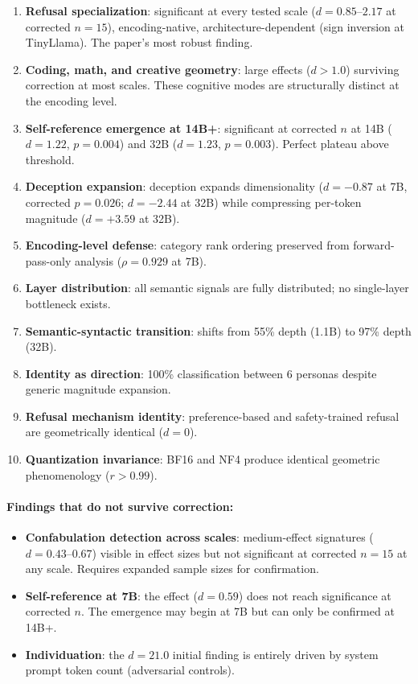 \documentclass[11pt,a4paper]{article}
\begin{document}
\begin{enumerate}[leftmargin=*]
    \item \textbf{Refusal specialization}: significant at every tested scale ($d = 0.85$--$2.17$ at corrected $n = 15$), encoding-native, architecture-dependent (sign inversion at TinyLlama). The paper's most robust finding.
    \item \textbf{Coding, math, and creative geometry}: large effects ($d > 1.0$) surviving correction at most scales. These cognitive modes are structurally distinct at the encoding level.
    \item \textbf{Self-reference emergence at 14B+}: significant at corrected $n$ at 14B ($d = 1.22$, $p = 0.004$) and 32B ($d = 1.23$, $p = 0.003$). Perfect plateau above threshold.
    \item \textbf{Deception expansion}: deception expands dimensionality ($d = -0.87$ at 7B, corrected $p = 0.026$; $d = -2.44$ at 32B) while compressing per-token magnitude ($d = +3.59$ at 32B).
    \item \textbf{Encoding-level defense}: category rank ordering preserved from forward-pass-only analysis ($\rho = 0.929$ at 7B).
    \item \textbf{Layer distribution}: all semantic signals are fully distributed; no single-layer bottleneck exists.
    \item \textbf{Semantic-syntactic transition}: shifts from 55\% depth (1.1B) to 97\% depth (32B).
    \item \textbf{Identity as direction}: 100\% classification between 6 personas despite generic magnitude expansion.
    \item \textbf{Refusal mechanism identity}: preference-based and safety-trained refusal are geometrically identical ($d = 0$).
    \item \textbf{Quantization invariance}: BF16 and NF4 produce identical geometric phenomenology ($r > 0.99$).
\end{enumerate}

\paragraph{Findings that do not survive correction:}
\begin{itemize}[leftmargin=*]
    \item \textbf{Confabulation detection across scales}: medium-effect signatures ($d = 0.43$--$0.67$) visible in effect sizes but not significant at corrected $n = 15$ at any scale. Requires expanded sample sizes for confirmation.
    \item \textbf{Self-reference at 7B}: the effect ($d = 0.59$) does not reach significance at corrected $n$. The emergence may begin at 7B but can only be confirmed at 14B+.
    \item \textbf{Individuation}: the $d = 21.0$ initial finding is entirely driven by system prompt token count (adversarial controls).
\end{itemize}
\end{document}
